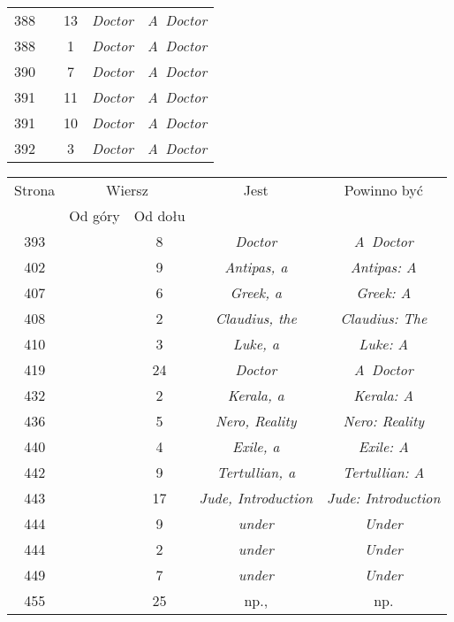 \documentclass[a4paper,11pt]{article}
\begin{document}
\begin{center}
\begin{tabular}{|c|c|c|c|c|}
    388 & & 13 & \textit{Doctor} & \textit{A~Doctor} \\
    388 & &  1 & \textit{Doctor} & \textit{A~Doctor} \\
    390 & &  7 & \textit{Doctor} & \textit{A~Doctor} \\
    391 & & 11 & \textit{Doctor} & \textit{A~Doctor} \\
    391 & & 10 & \textit{Doctor} & \textit{A~Doctor} \\
    392 & &  3 & \textit{Doctor} & \textit{A~Doctor} \\
    \hline
  \end{tabular}





  \newpage

  \begin{tabular}{|c|c|c|c|c|}
    \hline
    Strona & \multicolumn{2}{c|}{Wiersz} & Jest
                              & Powinno być \\ \cline{2-3}
    & Od góry & Od dołu & & \\
    \hline
    393 & &  8 & \textit{Doctor} & \textit{A~Doctor} \\
    402 & &  9 & \textit{Antipas, a} & \textit{Antipas: A }\\
    407 & &  6 & \textit{Greek, a} & \textit{Greek: A} \\
    408 & &  2 & \textit{Claudius, the} & \textit{Claudius: The} \\
    410 & &  3 & \textit{Luke, a} & \textit{Luke: A} \\
    419 & & 24 & \textit{Doctor} & \textit{A~Doctor} \\
    432 & &  2 & \textit{Kerala, a} & \textit{Kerala: A} \\
    436 & &  5 & \textit{Nero, Reality} & \textit{Nero: Reality} \\
    440 & &  4 & \textit{Exile, a} & \textit{Exile: A} \\
    442 & &  9 & \textit{Tertullian, a} & \textit{Tertullian: A} \\
    443 & & 17 & \textit{Jude, Introduction}
           & \textit{Jude: Introduction} \\
    444 & &  9 & \textit{under} & \textit{Under} \\
    444 & &  2 & \textit{under} & \textit{Under} \\
    449 & &  7 & \textit{under} & \textit{Under} \\
    455 & & 25 & np., & np. \\

\end{tabular}
\end{center}
\end{document}
